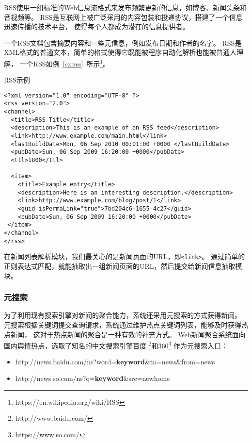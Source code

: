 RSS使用一组标准的Web信息流格式来发布频繁更新的信息，如博客、新闻头条和音视频等。
RSS是互联网上被广泛采用的内容包装和投递协议，搭建了一个信息迅速传播的技术平台，
使得每个人都成为潜在的信息提供者。

一个RSS文档包含摘要内容和一些元信息，例如发布日期和作者的名字。
RSS是XML格式的普通文本，简单的格式使得它既能被程序自动化解析也能被普通人理解，
一个RSS如例~\ref{ex:rss}~所示\footnote{https://en.wikipedia.org/wiki/RSS}。

\begin{example}
\label{ex:rss}
RSS示例
\end{example}
\begin{oframed}
\begin{verbatim}
<?xml version="1.0" encoding="UTF-8" ?>
<rss version="2.0">
<channel>
  <title>RSS Title</title>
  <description>This is an example of an RSS feed</description>
  <link>http://www.example.com/main.html</link>
  <lastBuildDate>Mon, 06 Sep 2010 00:01:00 +0000 </lastBuildDate>
  <pubDate>Sun, 06 Sep 2009 16:20:00 +0000</pubDate>
  <ttl>1800</ttl>

  <item>
    <title>Example entry</title>
    <description>Here is an interesting description.</description>
    <link>http://www.example.com/blog/post/1</link>
    <guid isPermaLink="true">7bd204c6-1655-4c27</guid>
    <pubDate>Sun, 06 Sep 2009 16:20:00 +0000</pubDate>
 </item>
</channel>
</rss>
\end{verbatim}
\end{oframed}

在新闻列表解析模块，我们最关心的是新闻页面的URL，即\texttt{<link>}。
通过简单的正则表达式匹配，就能抽取出一组新闻页面的URL，然后提交给新闻信息抽取模块。

\subsubsection{元搜索}
为了利用现有搜索引擎对新闻的聚合能力，系统还采用元搜索的方式获得新闻。
元搜索根据关键词提交查询请求，系统通过维护热点关键词列表，能够及时获得热点新闻，
这对于热点新闻的聚合是一种有效的补充方式。
Web新闻聚合系统面向国内舆情热点，选取了知名的中文搜索引擎百度
\footnote{http://www.baidu.com/}和360\footnote{https://www.so.com/}
作为元搜索入口：
\begin{itemize}
\item http://news.baidu.com/ns?word=\textbf{keyword}\&tn=news\&from=news
\item http://news.so.com/ns?q=\textbf{keyword}\&src=newhome
\end{itemize}

